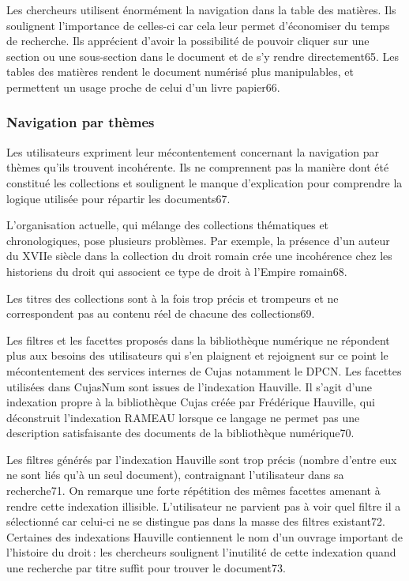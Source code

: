 Les chercheurs utilisent énormément la navigation dans la table des matières. Ils soulignent l’importance de celles-ci car cela leur permet d’économiser du temps de recherche. Ils apprécient d’avoir la possibilité de pouvoir cliquer sur une section ou une sous-section dans le document et de s’y rendre directement65. Les tables des matières rendent le document numérisé plus manipulables, et permettent un usage proche de celui d’un livre papier66. 

\subsubsection{Navigation par thèmes}  

Les utilisateurs expriment leur mécontentement concernant la navigation par thèmes qu’ils trouvent incohérente. Ils ne comprennent pas la manière dont été constitué les collections et soulignent le manque d’explication pour comprendre la logique utilisée pour répartir les documents67. 

L’organisation actuelle, qui mélange des collections thématiques et chronologiques, pose plusieurs problèmes. Par exemple, la présence d’un auteur du XVIIe siècle dans la collection du droit romain crée une incohérence chez les historiens du droit qui associent ce type de droit à l’Empire romain68. 

Les titres des collections sont à la fois trop précis et trompeurs et ne correspondent pas au contenu réel de chacune des collections69.  

Les filtres et les facettes proposés dans la bibliothèque numérique ne répondent plus aux besoins des utilisateurs qui s’en plaignent et rejoignent sur ce point le mécontentement des services internes de Cujas notamment le DPCN. Les facettes utilisées dans CujasNum sont issues de l’indexation Hauville. Il s’agit d’une indexation propre à la bibliothèque Cujas créée par Frédérique Hauville, qui déconstruit l’indexation RAMEAU lorsque ce langage ne permet pas une description satisfaisante des documents de la bibliothèque numérique70. 

Les filtres générés par l’indexation Hauville sont trop précis (nombre d’entre eux ne sont liés qu’à un seul document), contraignant l’utilisateur dans sa recherche71. On remarque une forte répétition des mêmes facettes amenant à rendre cette indexation illisible. L’utilisateur ne parvient pas à voir quel filtre il a sélectionné car celui-ci ne se distingue pas dans la masse des filtres existant72. Certaines des indexations Hauville contiennent le nom d’un ouvrage important de l’histoire du droit : les chercheurs soulignent l’inutilité de cette indexation quand une recherche par titre suffit pour trouver le document73.  

